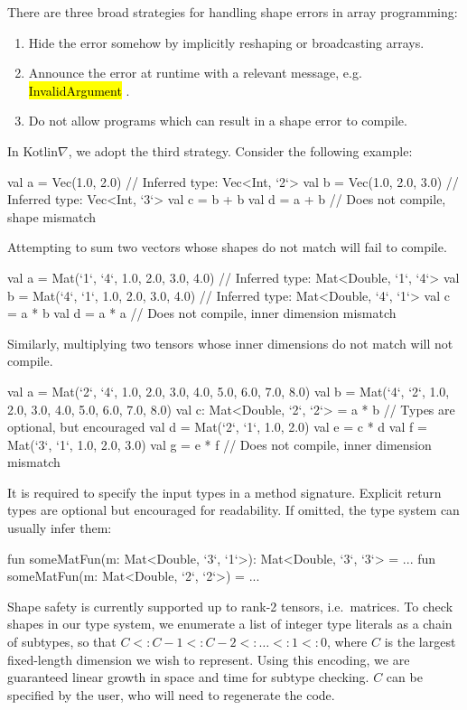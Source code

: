 \documentclass[12pt,initial,twoside,maitrise]{dms}
\newcommand{\inline}[1]{%
\begingroup%
\sethlcolor{slightgray}%
\hl{\ttfamily\small #1}%
\endgroup
}
\numberwithin{equation}{section}
\numberwithin{table}{chapter}
\numberwithin{figure}{chapter}
\begin{document}
\noindent There are three broad strategies for handling shape errors in array programming: \\
%
\begin{enumerate}
    \item Hide the error somehow by implicitly reshaping or broadcasting arrays.
    \item Announce the error at runtime with a relevant message, e.g.~\inline{InvalidArgument}.
    \item Do not allow programs which can result in a shape error to compile. \\
\end{enumerate}
%
In Kotlin$\nabla$, we adopt the third strategy. Consider the following example:
%
\begin{kotlinlisting}
val a = Vec(1.0, 2.0) // Inferred type: Vec<Int, `2`>
val b = Vec(1.0, 2.0, 3.0) // Inferred type: Vec<Int, `3`>
val c = b + b
val d = a + b // Does not compile, shape mismatch
\end{kotlinlisting}
%
Attempting to sum two vectors whose shapes do not match will fail to compile.
%
\begin{kotlinlisting}
val a = Mat(`1`, `4`, 1.0, 2.0, 3.0, 4.0) // Inferred type: Mat<Double, `1`, `4`>
val b = Mat(`4`, `1`, 1.0, 2.0, 3.0, 4.0) // Inferred type: Mat<Double, `4`, `1`>
val c = a * b
val d = a * a // Does not compile, inner dimension mismatch
\end{kotlinlisting}
%
Similarly, multiplying two tensors whose inner dimensions do not match will not compile.
%
\begin{kotlinlisting}
val a = Mat(`2`, `4`,
            1.0, 2.0, 3.0, 4.0,
            5.0, 6.0, 7.0, 8.0)
val b = Mat(`4`, `2`,
            1.0, 2.0,
            3.0, 4.0,
            5.0, 6.0,
            7.0, 8.0)
val c: Mat<Double, `2`, `2`> = a * b // Types are optional, but encouraged
val d = Mat(`2`, `1`, 1.0, 2.0)
val e = c * d
val f = Mat(`3`, `1`, 1.0, 2.0, 3.0)
val g = e * f // Does not compile, inner dimension mismatch
\end{kotlinlisting}
%
It is required to specify the input types in a method signature. Explicit return types are optional but encouraged for readability. If omitted, the type system can usually infer them:
%
\begin{kotlinlisting}
fun someMatFun(m: Mat<Double, `3`, `1`>): Mat<Double, `3`, `3`> = ...
fun someMatFun(m: Mat<Double, `2`, `2`>) = ...
\end{kotlinlisting}
%
Shape safety is currently supported up to rank-2 tensors, i.e.\ matrices. To check shapes in our type system, we enumerate a list of integer type literals as a chain of subtypes, so that $C <: C - 1 <: C - 2 <: \dots <: 1 <: 0$, where $C$ is the largest fixed-length dimension we wish to represent. Using this encoding, we are guaranteed linear growth in space and time for subtype checking. $C$ can be specified by the user, who will need to regenerate the code.
\end{document}
